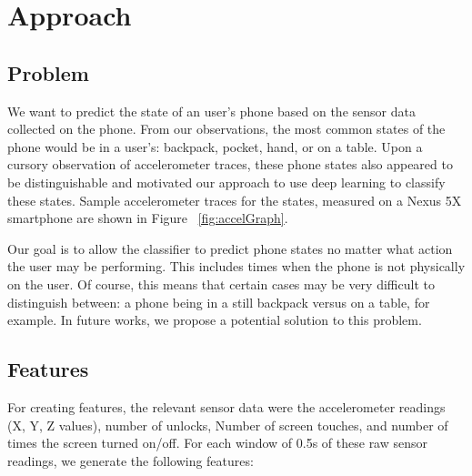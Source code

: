 \section{Approach}

\subsection{Problem}
We want to predict the state of an user's phone based on the sensor data collected on the phone. 
From our observations, the most common states of the phone would be in a user's: backpack, pocket, hand, or on a table.
Upon a cursory observation of accelerometer traces, these phone states also appeared to be distinguishable and motivated
our approach to use deep learning to classify these states.
Sample accelerometer traces for the states, measured on a Nexus 5X
smartphone are shown in Figure ~\ref{fig:accelGraph}.

\begin{center}
 \scalebox{0.375}{}
  \scalebox{0.375}{}
  \scalebox{0.375}{}
  \scalebox{0.375}{}
  \label{fig:accelGraph}
\end{center}


Our goal is to allow the classifier to predict phone states no matter what action the user may be performing.
This includes times when the phone is not physically on the user. 
Of course, this means that certain cases may be very difficult to distinguish between: a phone being in a still backpack versus on a table, for example.
In future works, we propose a potential solution to this problem. 


\subsection{Features}
For creating features, the relevant sensor data were the accelerometer readings (X, Y, Z values), number of unlocks, Number of screen touches, and number of times the screen turned on/off. For each window of 0.5s of these raw sensor readings, we generate the following features:

